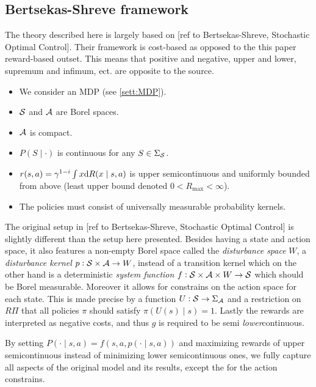\subsection{Bertsekas-Shreve framework}
The theory described here is largely based on
[ref to Bertsekas-Shreve, Stochastic Optimal Control].
Their framework is cost-based as opposed to the this paper reward-based outset.
This means that positive and negative, upper and lower, supremum and infimum,
ect. are opposite to the source.
\begin{sett}[BS]
  \begin{itemize}
    \item We consider an MDP (see \cref{sett:MDP}).
    \item $\mathcal{S}$ and $\mathcal{A}$ are Borel spaces.
    \item $\mathcal{A}$ is compact.
    \item $P(S \mid \cdot)$ is continuous for any $S \in \Sigma_{\mathcal{S}}$.
    \item $r(s,a) = \gamma^{1-i} \int x \mathrm{d} R(x \mid s, a)$ 
      is upper semicontinuous and uniformly bounded from above
      (least upper bound denoted $0 < R_{\max} < \infty$).
    \item The policies must consist of
      universally measurable probability kernels.
  \end{itemize}
  \label{sett:BS}
\end{sett}
The original setup in [ref to Bertsekas-Shreve, Stochastic Optimal Control]
is slightly different than the setup here presented.
Besides having a state and action space, it also features a 
non-empty Borel space called the
\emph{disturbance space} $W$, a \emph{disturbance kernel}
$p: \mathcal{S} \times \mathcal{A} \to W$,
instead of a transition kernel which on the other hand is a deterministic
\emph{system function} $f : \mathcal{S} \times \mathcal{A} \times W \to \mathcal{S}$
which should be Borel measurable.
Moreover it allows for constrains on the action space for each state.
This is made precise by a function $U:\mathcal{S} \to \Sigma_{\mathcal{A}}$
and a restriction on $R\Pi$ that all policies $\pi$ should satisfy
$\pi(U(s) \mid s) = 1$.
Lastly the rewards are interpreted as negative costs, and thus
$g$ is required to be semi \emph{lower}continuous.

By setting $P(\cdot \mid s, a) = f(s, a, p(\cdot \mid s, a))$
and maximizing rewards of upper semicontinuous instead of
minimizing lower semicontinuous ones, we fully capture
all aspects of the original model and its results,
except the for the action constrains. %

